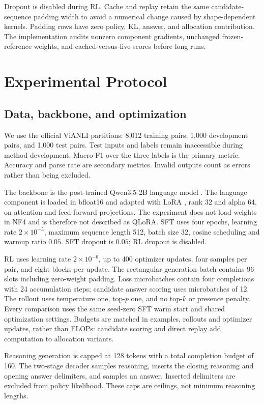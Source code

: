 \documentclass[11pt]{article}
\begin{document}
Dropout is disabled during RL. Cache and replay retain the same candidate-sequence padding width to avoid a numerical change caused by shape-dependent kernels. Padding rows have zero policy, KL, answer, and allocation contribution. The implementation audits nonzero component gradients, unchanged frozen-reference weights, and cached-versus-live scores before long runs.

\section{Experimental Protocol}
\subsection{Data, backbone, and optimization}
We use the official ViANLI partitions: 8,012 training pairs, 1,000 development pairs, and 1,000 test pairs. Test inputs and labels remain inaccessible during method development. Macro-F1 over the three labels is the primary metric. Accuracy and parse rate are secondary metrics. Invalid outputs count as errors rather than being excluded.

The backbone is the post-trained Qwen3.5-2B language model \citep{qwen-team-2026-qwen35}. The language component is loaded in bfloat16 and adapted with LoRA \citep{hu-etal-2022-lora}, rank 32 and alpha 64, on attention and feed-forward projections. The experiment does not load weights in NF4 and is therefore not described as QLoRA. SFT uses four epochs, learning rate $2\times10^{-5}$, maximum sequence length 512, batch size 32, cosine scheduling and warmup ratio $0.05$. SFT dropout is $0.05$; RL dropout is disabled.

RL uses learning rate $2\times10^{-6}$, up to 400 optimizer updates, four samples per pair, and eight blocks per update. The rectangular generation batch contains 96 slots including zero-weight padding. Loss microbatches contain four completions with 24 accumulation steps; candidate answer scoring uses microbatches of 12. The rollout uses temperature one, top-$p$ one, and no top-$k$ or presence penalty. Every comparison uses the same seed-zero SFT warm start and shared optimization settings. Budgets are matched in examples, rollouts and optimizer updates, rather than FLOPs: candidate scoring and direct replay add computation to allocation variants.

Reasoning generation is capped at 128 tokens with a total completion budget of 160. The two-stage decoder samples reasoning, inserts the closing reasoning and opening answer delimiters, and samples an answer. Inserted delimiters are excluded from policy likelihood. These caps are ceilings, not minimum reasoning lengths.
\end{document}
